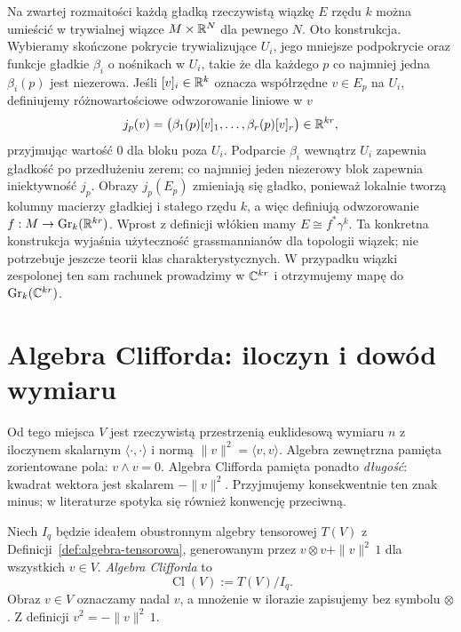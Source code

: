 \begin{uwaga}
Na zwartej rozmaitości każdą gładką rzeczywistą wiązkę $E$
rzędu $k$ można umieścić w trywialnej wiązce
$M\times\mathbb{R}^N$ dla pewnego $N$.
Oto konstrukcja. Wybieramy skończone pokrycie
trywializujące $U_i$, jego mniejsze podpokrycie
oraz funkcje gładkie $\beta_i$ o nośnikach w $U_i$,
takie że dla każdego $p$ co najmniej jedna
$\beta_i(p)$ jest niezerowa. Jeśli $[v]_i\in\mathbb{R}^k$
oznacza współrzędne $v\in E_p$ na $U_i$,
definiujemy różnowartościowe odwzorowanie liniowe w $v$
\[
 j_p(v)=\bigl(\beta_1(p)[v]_1,\ldots,
                  \beta_r(p)[v]_r\bigr)\in\mathbb{R}^{kr},
\]
przyjmując wartość $0$ dla bloku poza $U_i$.
Podparcie $\beta_i$ wewnątrz $U_i$ zapewnia
gładkość po przedłużeniu zerem; co najmniej
jeden niezerowy blok zapewnia iniektywność $j_p$.
Obrazy $j_p(E_p)$ zmieniają się gładko, ponieważ
lokalnie tworzą kolumny macierzy gładkiej i
stałego rzędu $k$, a więc definiują odwzorowanie
$f:M\to\operatorname{Gr}_k(\mathbb{R}^{kr})$.
Wprost z definicji włókien mamy
$E\cong f^*\gamma^k$. Ta konkretna konstrukcja
wyjaśnia użyteczność grassmannianów dla topologii
wiązek; nie potrzebuje jeszcze teorii klas
charakterystycznych.
W przypadku wiązki zespolonej ten sam rachunek
prowadzimy w $\mathbb{C}^{kr}$ i otrzymujemy mapę do
$\operatorname{Gr}_k(\mathbb{C}^{kr})$.
\end{uwaga}

\section{Algebra Clifforda: iloczyn i dowód wymiaru}
\label{sec:clifford}

Od tego miejsca $V$ jest rzeczywistą przestrzenią
euklidesową wymiaru $n$ z iloczynem skalarnym
$\langle\cdot,\cdot\rangle$ i normą
$\|v\|^2=\langle v,v\rangle$. Algebra zewnętrzna
pamięta zorientowane pola: $v\wedge v=0$.
Algebra Clifforda pamięta ponadto \emph{długość}:
kwadrat wektora jest skalarem $-\|v\|^2$.
Przyjmujemy konsekwentnie ten znak minus;
w literaturze spotyka się również konwencję przeciwną.

\begin{definicja}
\label{def:clifford}
Niech $I_q$ będzie ideałem obustronnym algebry
tensorowej $T(V)$ z Definicji~\ref{def:algebra-tensorowa},
generowanym przez
$v\otimes v+\|v\|^2\,1$ dla wszystkich $v\in V$.
\emph{Algebra Clifforda} to
\[
 \operatorname{Cl}(V):=T(V)/I_q.
\]
Obraz $v\in V$ oznaczamy nadal $v$,
a mnożenie w ilorazie zapisujemy bez symbolu $\otimes$.
Z definicji $v^2=-\|v\|^2\,1$.
\end{definicja}

